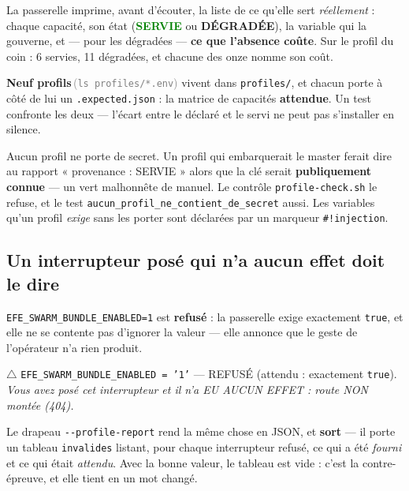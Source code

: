\documentclass[10pt]{report}
\newcommand{\code}[1]{\texttt{\small #1}}
\newcommand{\ok}[1]{\textcolor{green}{\textbf{#1}}}
\newcommand{\att}[1]{\textcolor{amber}{\textbf{#1}}}
\newcommand{\mesure}[2]{\textbf{#1}\,\footnotesize\textcolor{grey}{(#2)}\normalsize}
\begin{document}
La passerelle imprime, avant d'écouter, la liste de ce qu'elle sert \emph{réellement} : chaque
capacité, son état (\ok{SERVIE} ou \att{DÉGRADÉE}), la variable qui la gouverne, et --- pour les
dégradées --- \textbf{ce que l'absence coûte}. Sur le profil du coin : 6 servies, 11 dégradées, et
chacune des onze nomme son coût.

\mesure{Neuf profils}{\code{ls profiles/*.env}} vivent dans \code{profiles/}, et chacun porte à côté
de lui un \code{*.expected.json} : la matrice de capacités \textbf{attendue}. Un test confronte les
deux --- l'écart entre le déclaré et le servi ne peut pas s'installer en silence.

\begin{these}
Aucun profil ne porte de secret. Un profil qui embarquerait le master ferait dire au rapport
« provenance : SERVIE » alors que la clé serait \textbf{publiquement connue} --- un vert malhonnête
de manuel. Le contrôle \code{profile-check.sh} le refuse, et le test
\code{aucun\_profil\_ne\_contient\_de\_secret} aussi. Les variables qu'un profil \emph{exige} sans
les porter sont déclarées par un marqueur \code{\#!injection}.
\end{these}

\subsection{Un interrupteur posé qui n'a aucun effet doit le dire}

\code{EFE\_SWARM\_BUNDLE\_ENABLED=1} est \textbf{refusé} : la passerelle exige exactement
\code{true}, et elle ne se contente pas d'ignorer la valeur --- elle annonce que le geste de
l'opérateur n'a rien produit.

\begin{extrait}
\footnotesize
$\triangle$\; \code{EFE\_SWARM\_BUNDLE\_ENABLED = '1'} --- REFUSÉ (attendu : exactement \code{true}).\\
\hspace*{1.2em}\emph{Vous avez posé cet interrupteur et il n'a EU AUCUN EFFET : route NON montée (404).}
\end{extrait}

Le drapeau \code{-{}-profile-report} rend la même chose en JSON, et \textbf{sort} --- il porte un
tableau \code{invalides} listant, pour chaque interrupteur refusé, ce qui a été \emph{fourni} et ce
qui était \emph{attendu}. Avec la bonne valeur, le tableau est vide : c'est la contre-épreuve, et
elle tient en un mot changé.
\end{document}
